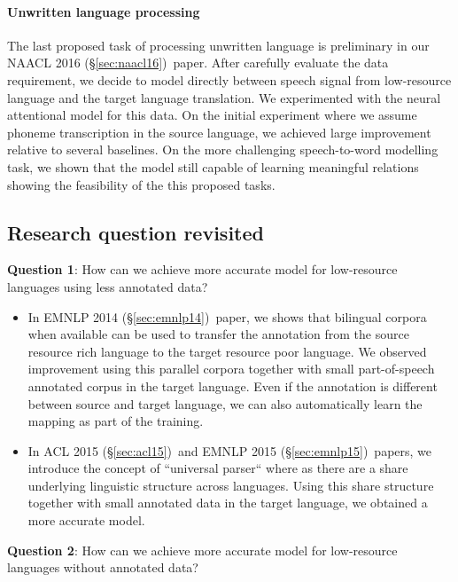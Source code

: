 \documentclass[12pt,twoside,final,hidelinks]{ltthesis}
\theoremstyle{definition}
\newcommand\emnlpiv{EMNLP 2014 (\S\ref{sec:emnlp14})}
\newcommand\aclv{ACL 2015 (\S\ref{sec:acl15})}
\newcommand\emnlpv{EMNLP 2015 (\S\ref{sec:emnlp15})}
\newcommand\naaclvi{NAACL 2016 (\S\ref{sec:naacl16})}
\begin{document}
\paragraph{Unwritten language processing}The last proposed task of processing unwritten language is preliminary in our \naaclvi\ paper. After carefully evaluate the data requirement, we decide 
to model directly between speech signal from low-resource language and the target language translation. We experimented with the neural attentional model 
for this data. On the initial experiment where we assume phoneme transcription in the source language, we achieved large improvement relative to several 
baselines. On the more challenging speech-to-word modelling task, we shown that the model still capable of learning meaningful relations showing the feasibility 
of the this proposed tasks. 

\subsection{Research question revisited}
\textbf{Question 1}: How can we achieve more accurate model for low-resource languages using less annotated data? 
\begin{itemize}
\item In \emnlpiv\ paper, we shows that bilingual corpora when available can be used to transfer the annotation from the source resource rich language to the target 
resource poor language. We observed improvement using this parallel corpora together with small part-of-speech annotated corpus in the target language. Even if 
the annotation is different between source and target language, we can also automatically learn the mapping as part of the training. 
\item 	In \aclv\ and \emnlpv\ papers, we introduce the concept of ``universal parser`` where as there are a share underlying linguistic structure across languages. 
Using this share structure together with small annotated data in the target language, we obtained a more accurate model.  
\end{itemize}

\textbf{Question 2}: How can we achieve more accurate model for low-resource languages without annotated data?
\end{document}
